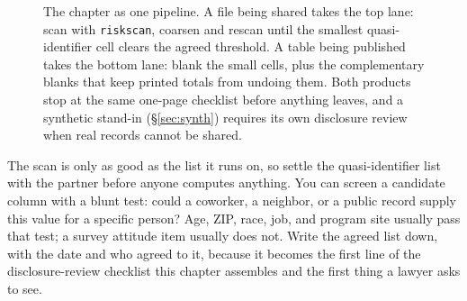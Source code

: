 \begin{figure}[t]
\centering
{}
\caption[The release pipeline this chapter teaches]{The chapter as one pipeline. A file being shared takes the top lane: scan with \texttt{riskscan}, coarsen and rescan until the smallest quasi-identifier cell clears the agreed threshold. A table being published takes the bottom lane: blank the small cells, plus the complementary blanks that keep printed totals from undoing them. Both products stop at the same one-page checklist before anything leaves, and a synthetic stand-in (\S\ref{sec:synth}) requires its own disclosure review when real records cannot be shared.}
\label{fig:ch14-viz-pipeline}
\end{figure}


The scan is only as good as the list it runs on, so settle the quasi-identifier list with the partner before anyone computes anything. You can screen a candidate column with a blunt test: could a coworker, a neighbor, or a public record supply this value for a specific person? Age, ZIP, race, job, and program site usually pass that test; a survey attitude item usually does not. Write the agreed list down, with the date and who agreed to it, because it becomes the first line of the disclosure-review checklist this chapter assembles and the first thing a lawyer asks to see.

